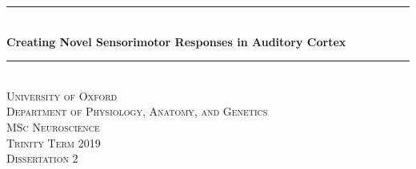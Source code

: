 \begin{titlepage}


\newcommand{\HRule}{\rule{\linewidth}{0.5mm}} %

\center %


\HRule \\[0.4cm]
{ \huge \bfseries Creating Novel Sensorimotor Responses in Auditory Cortex}\\[0.4cm] %
\HRule \\[1.5cm]



\textsc{\LARGE University of Oxford}\\[0.5cm] %
\textsc{\Large Department of Physiology, Anatomy, and Genetics}\\[1.5cm]


\textsc{\Large MSc Neuroscience}\\[0.5cm] %
\textsc{\large Trinity Term 2019\\Dissertation 2}\\[0.5cm] %


\vfill


\end{titlepage}
